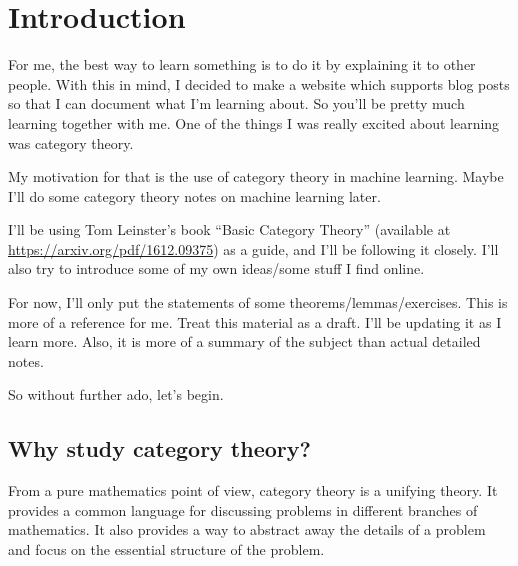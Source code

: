 \documentclass{article}
\theoremstyle{definition}
\newcommand{\cat}[1]{\mathscr{#1}}
\begin{document}
\ifdefined\HCode
\fi


\section{Introduction}

For me, the best way to learn something is to do it by explaining it to other people. With this in mind,
I decided to make a website which supports blog posts so that I can document what I'm learning about.
So you'll be pretty much learning together with me. One of the things I was really excited about learning was
category theory.

My motivation for that is the use of category theory in machine learning. Maybe I'll do some category
theory notes on machine learning later.

I'll be using Tom Leinster's book ``Basic Category Theory'' (available at \url{https://arxiv.org/pdf/1612.09375}) as a guide, and I'll be following it closely.
I'll also try to introduce some of my own ideas/some stuff I find online.

For now, I'll only put the statements of some theorems/lemmas/exercises. This is more of a reference for me. Treat
this material as a draft. I'll be updating it as I learn more. Also, it is more of a summary of the subject than actual
detailed notes.

So without further ado, let's begin.

\subsection{Why study category theory?}

From a pure mathematics point of view, category theory is a unifying theory. It provides a common language for discussing problems in different branches of mathematics. It also provides a way to abstract away the details of a problem and focus on the essential structure of the problem.
\end{document}
